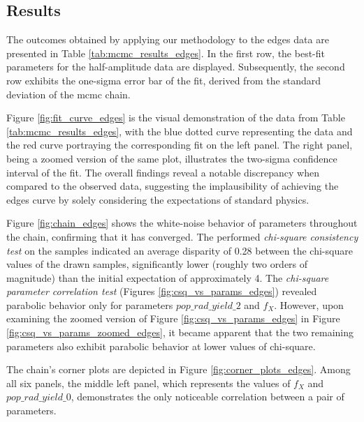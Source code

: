 \documentclass[12pt, TexShade, letterpaper]{report}
\begin{document}
\subsection{Results}
The outcomes obtained by applying our methodology to the \gls{edges} data are presented in Table \ref{tab:mcmc_results_edges}. In the first row, the best-fit parameters for the half-amplitude data are displayed. Subsequently, the second row exhibits the one-sigma error bar of the fit, derived from the standard deviation of the \gls{mcmc} chain. \par
Figure \ref{fig:fit_curve_edges} is the visual demonstration of the data from Table \ref{tab:mcmc_results_edges}, with the blue dotted curve representing the data and the red curve portraying the corresponding fit on the left panel. The right panel, being a zoomed version of the same plot, illustrates the two-sigma confidence interval of the fit. The overall findings reveal a notable discrepancy when compared to the observed data, suggesting the implausibility of achieving the \gls{edges} curve by solely considering the expectations of standard physics.\par
Figure \ref{fig:chain_edges} shows the white-noise behavior of parameters throughout the chain, confirming that it has converged. The performed \emph{chi-square consistency test} on the samples indicated an average disparity of 0.28 between the chi-square values of the drawn samples, significantly lower (roughly two orders of magnitude) than the initial expectation of approximately 4. The \emph{chi-square parameter correlation test} (Figures \ref{fig:csq_vs_params_edges}) revealed parabolic behavior only for parameters $pop\_rad\_yield\_2$ and $f_X$. However, upon examining the zoomed version of Figure \ref{fig:csq_vs_params_edges} in Figure \ref{fig:csq_vs_params_zoomed_edges}, it became apparent that the two remaining parameters also exhibit parabolic behavior at lower values of chi-square.\par
The chain's corner plots are depicted in Figure \ref{fig:corner_plots_edges}. Among all six panels, the middle left panel, which represents the values of $f_X$ and $pop\_rad\_yield\_0$, demonstrates the only noticeable correlation between a pair of parameters.
 
\end{document}
